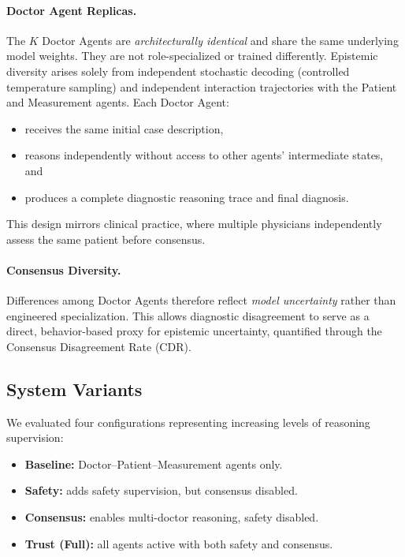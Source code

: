 \documentclass[letterpaper]{article} %
\begin{document}
\paragraph{Doctor Agent Replicas.}
The $K$ Doctor Agents are \emph{architecturally identical} and share the same underlying model weights. 
They are not role-specialized or trained differently. 
Epistemic diversity arises solely from independent stochastic decoding (controlled temperature sampling) and independent interaction trajectories with the Patient and Measurement agents.
Each Doctor Agent:
\begin{itemize}
    \item receives the same initial case description,
    \item reasons independently without access to other agents’ intermediate states, and
    \item produces a complete diagnostic reasoning trace and final diagnosis.
\end{itemize}
This design mirrors clinical practice, where multiple physicians independently assess the same patient before consensus.
\paragraph{Consensus Diversity.}
Differences among Doctor Agents therefore reflect \emph{model uncertainty} rather than engineered specialization.
This allows diagnostic disagreement to serve as a direct, behavior-based proxy for epistemic uncertainty, quantified through the Consensus Disagreement Rate (CDR).



\subsection{System Variants}
We evaluated four configurations representing increasing levels of reasoning supervision:
\begin{itemize}
    \item \textbf{Baseline:} Doctor–Patient–Measurement agents only.
    \item \textbf{Safety:} adds safety supervision, but consensus disabled.
    \item \textbf{Consensus:} enables multi-doctor reasoning, safety disabled.
    \item \textbf{Trust (Full):} all agents active with both safety and consensus.
\end{itemize}
\end{document}
